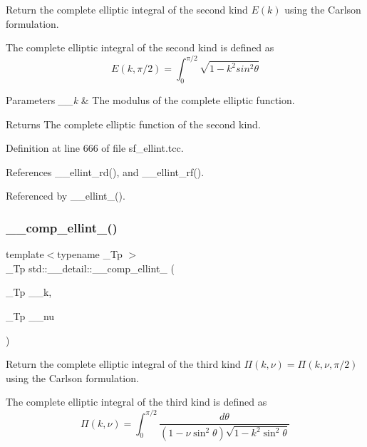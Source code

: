 Return the complete elliptic integral of the second kind $ E(k) $ using the Carlson formulation. 

The complete elliptic integral of the second kind is defined as \[ E(k,\pi/2) = \int_0^{\pi/2}\sqrt{1 - k^2 sin^2\theta} \]


\begin{DoxyParams}{Parameters}
{\em \+\_\+\+\_\+k} & The modulus of the complete elliptic function. \\
\hline
\end{DoxyParams}
\begin{DoxyReturn}{Returns}
The complete elliptic function of the second kind. 
\end{DoxyReturn}


Definition at line 666 of file sf\+\_\+ellint.\+tcc.



References \+\_\+\+\_\+ellint\+\_\+rd(), and \+\_\+\+\_\+ellint\+\_\+rf().



Referenced by \+\_\+\+\_\+ellint\+\_().

\mbox{\label{namespacestd_1_1____detail_a26b35b5d72366d30ac4644db8f2f8be4}} 
\subsubsection{\texorpdfstring{\+\_\+\+\_\+comp\+\_\+ellint\+\_()}{\_\_comp\_ellint\_3()}}
{\footnotesize\ttfamily template$<$typename \+\_\+\+Tp $>$ \\
\+\_\+\+Tp std\+::\+\_\+\+\_\+detail\+::\+\_\+\+\_\+comp\+\_\+ellint\+\_ (\begin{DoxyParamCaption}\item[{\+\_\+\+Tp}]{\+\_\+\+\_\+k,  }\item[{\+\_\+\+Tp}]{\+\_\+\+\_\+nu }\end{DoxyParamCaption})}



Return the complete elliptic integral of the third kind $ \Pi(k,\nu) = \Pi(k,\nu,\pi/2) $ using the Carlson formulation. 

The complete elliptic integral of the third kind is defined as \[ \Pi(k,\nu) = \int_0^{\pi/2} \frac{d\theta} {(1 - \nu \sin^2\theta)\sqrt{1 - k^2 \sin^2\theta}} \]



